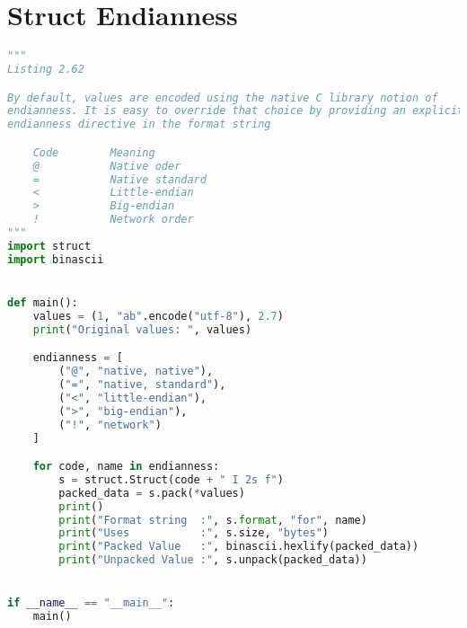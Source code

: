\documentclass[a4paper,landscape]{report}
\begin{document}
\section{Struct Endianness}
\begin{lstlisting}[language=Python]
"""
Listing 2.62

By default, values are encoded using the native C library notion of
endianness. It is easy to override that choice by providing an explicit
endianness directive in the format string

    Code        Meaning
    @           Native oder
    =           Native standard
    <           Little-endian
    >           Big-endian
    !           Network order
"""
import struct
import binascii


def main():
    values = (1, "ab".encode("utf-8"), 2.7)
    print("Original values: ", values)

    endianness = [
        ("@", "native, native"),
        ("=", "native, standard"),
        ("<", "little-endian"),
        (">", "big-endian"),
        ("!", "network")
    ]

    for code, name in endianness:
        s = struct.Struct(code + " I 2s f")
        packed_data = s.pack(*values)
        print()
        print("Format string  :", s.format, "for", name)
        print("Uses           :", s.size, "bytes")
        print("Packed Value   :", binascii.hexlify(packed_data))
        print("Unpacked Value :", s.unpack(packed_data))


if __name__ == "__main__":
    main()

\end{lstlisting}
\end{document}
